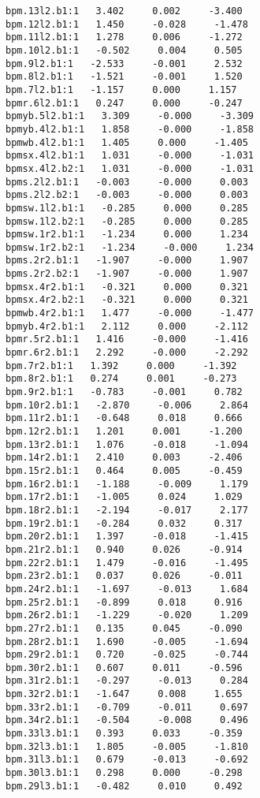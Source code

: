 \begin{verbatim}
bpm.13l2.b1:1   3.402     0.002     -3.400
bpm.12l2.b1:1   1.450     -0.028     -1.478
bpm.11l2.b1:1   1.278     0.006     -1.272
bpm.10l2.b1:1   -0.502     0.004     0.505
bpm.9l2.b1:1   -2.533     -0.001     2.532
bpm.8l2.b1:1   -1.521     -0.001     1.520
bpm.7l2.b1:1   -1.157     0.000     1.157
bpmr.6l2.b1:1   0.247     0.000     -0.247
bpmyb.5l2.b1:1   3.309     -0.000     -3.309
bpmyb.4l2.b1:1   1.858     -0.000     -1.858
bpmwb.4l2.b1:1   1.405     0.000     -1.405
bpmsx.4l2.b1:1   1.031     -0.000     -1.031
bpmsx.4l2.b2:1   1.031     -0.000     -1.031
bpms.2l2.b1:1   -0.003     -0.000     0.003
bpms.2l2.b2:1   -0.003     -0.000     0.003
bpmsw.1l2.b1:1   -0.285     0.000     0.285
bpmsw.1l2.b2:1   -0.285     0.000     0.285
bpmsw.1r2.b1:1   -1.234     0.000     1.234
bpmsw.1r2.b2:1   -1.234     -0.000     1.234
bpms.2r2.b1:1   -1.907     -0.000     1.907
bpms.2r2.b2:1   -1.907     -0.000     1.907
bpmsx.4r2.b1:1   -0.321     0.000     0.321
bpmsx.4r2.b2:1   -0.321     0.000     0.321
bpmwb.4r2.b1:1   1.477     -0.000     -1.477
bpmyb.4r2.b1:1   2.112     0.000     -2.112
bpmr.5r2.b1:1   1.416     -0.000     -1.416
bpmr.6r2.b1:1   2.292     -0.000     -2.292
bpm.7r2.b1:1   1.392     0.000     -1.392
bpm.8r2.b1:1   0.274     0.001     -0.273
bpm.9r2.b1:1   -0.783     -0.001     0.782
bpm.10r2.b1:1   -2.870     -0.006     2.864
bpm.11r2.b1:1   -0.648     0.018     0.666
bpm.12r2.b1:1   1.201     0.001     -1.200
bpm.13r2.b1:1   1.076     -0.018     -1.094
bpm.14r2.b1:1   2.410     0.003     -2.406
bpm.15r2.b1:1   0.464     0.005     -0.459
bpm.16r2.b1:1   -1.188     -0.009     1.179
bpm.17r2.b1:1   -1.005     0.024     1.029
bpm.18r2.b1:1   -2.194     -0.017     2.177
bpm.19r2.b1:1   -0.284     0.032     0.317
bpm.20r2.b1:1   1.397     -0.018     -1.415
bpm.21r2.b1:1   0.940     0.026     -0.914
bpm.22r2.b1:1   1.479     -0.016     -1.495
bpm.23r2.b1:1   0.037     0.026     -0.011
bpm.24r2.b1:1   -1.697     -0.013     1.684
bpm.25r2.b1:1   -0.899     0.018     0.916
bpm.26r2.b1:1   -1.229     -0.020     1.209
bpm.27r2.b1:1   0.135     0.045     -0.090
bpm.28r2.b1:1   1.690     -0.005     -1.694
bpm.29r2.b1:1   0.720     -0.025     -0.744
bpm.30r2.b1:1   0.607     0.011     -0.596
bpm.31r2.b1:1   -0.297     -0.013     0.284
bpm.32r2.b1:1   -1.647     0.008     1.655
bpm.33r2.b1:1   -0.709     -0.011     0.697
bpm.34r2.b1:1   -0.504     -0.008     0.496
bpm.33l3.b1:1   0.393     0.033     -0.359
bpm.32l3.b1:1   1.805     -0.005     -1.810
bpm.31l3.b1:1   0.679     -0.013     -0.692
bpm.30l3.b1:1   0.298     0.000     -0.298
bpm.29l3.b1:1   -0.482     0.010     0.492

\end{verbatim}
